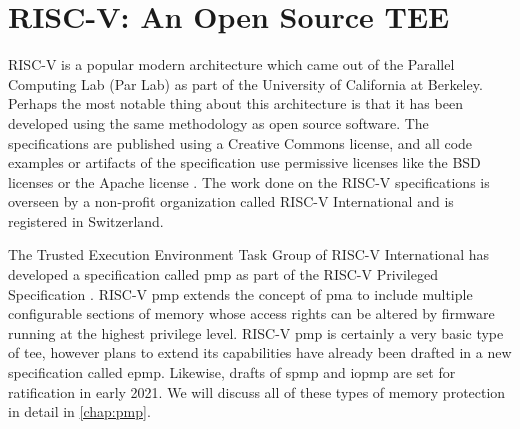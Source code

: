 \section{RISC-V: An Open Source TEE}
RISC-V is a popular modern architecture which came out of the Parallel Computing Lab (Par Lab) as part of the University of California at Berkeley. Perhaps the most notable thing about this architecture is that it has been developed using the same methodology as open source software. The specifications are published using a Creative Commons license, and all code examples or artifacts of the specification use permissive licenses like the BSD licenses or the Apache license \cite{UnprivIsa2019}. The work done on the RISC-V specifications is overseen by a non-profit organization called RISC-V International and is registered in Switzerland.

The Trusted Execution Environment Task Group of RISC-V International has developed a specification called \gls{pmp} as part of the RISC-V Privileged Specification \cite{PrivIsa2019}. RISC-V \gls{pmp} extends the concept of \gls{pma} to include multiple configurable sections of memory whose access rights can be altered by firmware running at the highest privilege level. RISC-V \gls{pmp} is certainly a very basic type of \gls{tee}, however plans to extend its capabilities have already been drafted in a new specification called \gls{epmp}. Likewise, drafts of \gls{spmp} and \gls{iopmp} are set for ratification in early 2021. We will discuss all of these types of memory protection in detail in \autoref{chap:pmp}.


